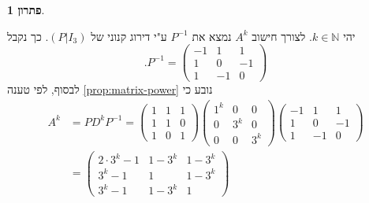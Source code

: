 \documentclass[12pt]{report}
\theoremstyle{plain}
\theoremstyle{definition}
\newtheorem*{solution}{פתרון}
\newcommand{\N}{\mathbb{N}}
\newcommand{\0}{\mathbf{0}}
\begin{document}
\begin{solution}
\begin{enumerate}[label=\alph*.]
יהי
$k\in\N$.
לצורך חישוב
$A^k$
נמצא את
$P^{-1}$
ע"י דירוג קנוני של 
$\left(P|I_3\right)$.
כך נקבל
$$
.P^{-1}=
\begin{pmatrix}
-1 & 1 & 1\\
1 & 0 & -1\\
1 & -1 & 0
\end{pmatrix}
$$
לבסוף, לפי טענה
\ref{prop:matrix-power}
נובע כי
$$
\begin{aligned}
A^k&=PD^kP^{-1}=\begin{pmatrix}
1 & 1 & 1 \\ 
1 & 1 & 0 \\
1 & 0 & 1
\end{pmatrix}\begin{pmatrix}
1^k & 0 & 0\\
0 & 3^k & 0\\
0 & 0 & 3^k
\end{pmatrix}\begin{pmatrix}
-1 & 1 & 1\\
1 & 0 & -1\\
1 & -1 & 0
\end{pmatrix} \\
&=\begin{pmatrix}
2\cdot 3^k-1 & 1-3^k & 1-3^k\\
3^k-1 & 1 & 1-3^k\\
3^k-1
& 1-3^k & 1
\end{pmatrix}
\end{aligned}
$$

\end{enumerate}
\end{solution}
\end{document}
